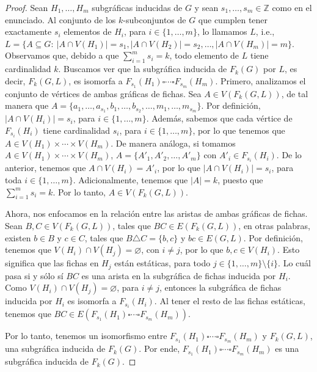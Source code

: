 \begin{proof}
    Sean $H_1, \dots, H_m$ subgr\'aficas inducidas de  $G$ y sean $s_1, \dots,
    s_m \in \mathbb{Z}$ como en el enunciado. Al conjunto de los
    $k$-subconjuntos de $G$ que cumplen tener exactamente $s_i$ elementos de
    $H_i$, para $i \in \{1, \dots, m\}$, lo llamamos $L$, i.e., $L = \{A
    \subseteq G \colon\ |A\cap V(H_1)|=s_1 , |A \cap V(H_2)|=s_2, \dots, |A \cap
    V(H_m)|=m \}$. Observamos que, debido a  que $\sum\limits_{i=1}^{m} s_i =
    k$, todo elemento de $L$ tiene cardinalidad $k$. Buscamos ver que la
    subgr\'afica inducida de $F_k(G)$ por $L$, es decir, $F_k(G,L)$, es isomorfa
    a $F_{s_1}(H_1) \square \cdots \square F_{s_m}(H_m)$. Primero, analizamos el
    conjunto de v\'ertices de ambas gr\'aficas de fichas. Sea $A \in
    V(F_k(G,L))$, de tal manera que $A=\{a_1, \dots, a_{s_1}, b_1,\dots,
    b_{s_2}, \dots, m_1, \dots, m_{s_m}\}$. Por definici\'on, $|A \cap V(H_i)|=
    s_i$, para $i \in \{1, \dots, m\}$. Adem\'as, sabemos que cada v\'ertice de
    $F_{s_i}(H_i)$ tiene cardinalidad $s_i$, para $i \in \{1, \dots, m\}$, por
    lo que tenemos que $A \in V(H_1) \times \cdots \times V(H_m)$. De manera
    an\'aloga, si tomamos $A \in V(H_1) \times \cdots \times V(H_m)$, $A =
    \{A'_1, A'_2, \dots, A'_m\}$ con $A'_i \in F_{s_i}(H_i)$. De lo anterior,
    tenemos que $A \cap V(H_i) = A'_i$, por lo que $|A \cap V(H_i)|= s_i$, para
    toda $i \in \{1, \dots, m\}$. Adicionalmente, tenemos que $|A|= k$, puesto
    que $\sum\limits_{i=1}^{m} s_i = k$. Por lo tanto, $A \in V(F_k(G,L))$.

    Ahora, nos enfocamos en la relaci\'on entre las aristas de ambas gr\'aficas
    de fichas. Sean $B, C \in V(F_k(G,L))$, tales que $BC \in E(F_k(G,L))$, en
    otras palabras, existen $b \in B$ y $c \in C$, tales que $B \triangle C =
    \{b, c\}$ y $bc \in E(G,L)$. Por definici\'on, tenemos que $V(H_i) \cap
    V(H_j) = \varnothing$, con $i \neq j$, por lo que $b, c \in V(H_i)$. Esto
    significa que las fichas en $H_j$ est\'an est\'aticas, para todo $j \in \{1,
    \dots, m\} \setminus \{i\}$. Lo cu\'al pasa si y s\'olo s\'i $BC$ es una
    arista en la subgr\'afica de fichas inducida por $H_i$. Como $V(H_i) \cap
    V(H_j) = \varnothing$, para $i \neq j$, entonces la subgr\'afica de fichas
    inducida por $H_i$ es isomorfa a $F_{s_i}(H_i)$. Al tener el resto de las
    fichas est\'aticas, tenemos que $BC \in E(F_{s_1}(H_1) \square \cdots
    \square F_{s_m}(H_m))$.

    Por lo tanto, tenemos un isomorfismo entre $F_{s_1}(H_1) \square \cdots
    \square F_{s_m}(H_m)$ y $F_k(G,L)$, una subgr\'afica inducida de $F_k(G)$.
    Por ende, $F_{s_1}(H_1) \square \cdots \square F_{s_m}(H_m)$ es una
    subgr\'afica inducida de $F_k(G)$.
\end{proof}

